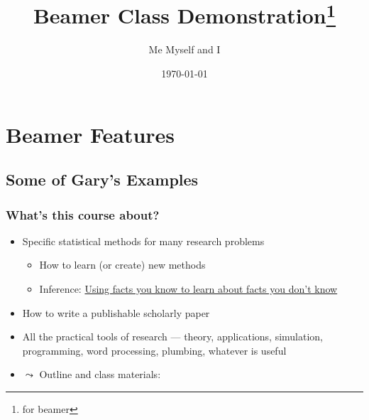 \documentclass[11pt]{beamer}
\title[Beamer Demo]{Beamer Class Demonstration\thanks{for beamer}}
\author{Me Myself and I }
\date{\today}
\institute{IQSS}
\begin{document}
\frame[plain]{\titlepage}


\section[Features]{Beamer Features}

\subsection{Some of Gary's Examples}
\begin{frame}\frametitle{What's this course about?}
  
  \begin{itemize}
  \item \alert{Specific statistical methods for many research problems}
    \begin{itemize}
    \item How to learn (or create) new methods
    \item Inference: \underline{Using facts you know to learn about
        facts you don't know}
    \end{itemize}
  \item \alert{How to write a publishable scholarly paper}
  \item \alert{All the practical tools of research} --- theory,
    applications, simulation, programming, word processing, plumbing,
    whatever is useful
  \item $\leadsto$ \alert{Outline and class materials:}
  \end{itemize}
\end{frame}
\end{document}
